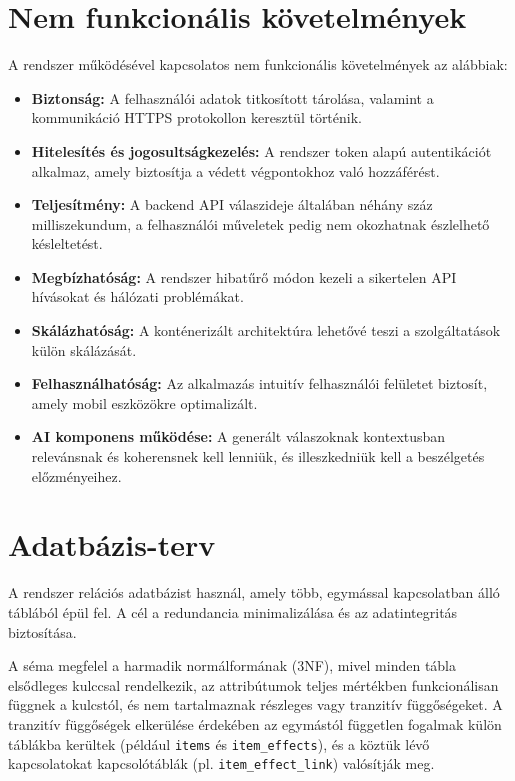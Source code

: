 \documentclass[
]{thesis-ekf}
\theoremstyle{definition}
\theoremstyle{remark}
\begin{document}
\section{Nem funkcionális követelmények}

A rendszer működésével kapcsolatos nem funkcionális követelmények az alábbiak:

\begin{itemize}
    \item \textbf{Biztonság:} A felhasználói adatok titkosított tárolása, valamint a kommunikáció HTTPS protokollon keresztül történik.
    \item \textbf{Hitelesítés és jogosultságkezelés:} A rendszer token alapú autentikációt alkalmaz, amely biztosítja a védett végpontokhoz való hozzáférést.
    \item \textbf{Teljesítmény:} A backend API válaszideje általában néhány száz milliszekundum, a felhasználói műveletek pedig nem okozhatnak észlelhető késleltetést.
    \item \textbf{Megbízhatóság:} A rendszer hibatűrő módon kezeli a sikertelen API hívásokat és hálózati problémákat.
    \item \textbf{Skálázhatóság:} A konténerizált architektúra lehetővé teszi a szolgáltatások külön skálázását.
    \item \textbf{Felhasználhatóság:} Az alkalmazás intuitív felhasználói felületet biztosít, amely mobil eszközökre optimalizált.
    \item \textbf{AI komponens működése:} A generált válaszoknak kontextusban relevánsnak és koherensnek kell lenniük, és illeszkedniük kell a beszélgetés előzményeihez.
\end{itemize}

\section{Adatbázis-terv}
\label{sec_db_plan}

A rendszer relációs adatbázist használ, amely több, egymással kapcsolatban álló táblából épül fel. A cél a redundancia minimalizálása és az adatintegritás biztosítása.

A séma megfelel a harmadik normálformának (3NF), mivel minden tábla elsődleges kulccsal rendelkezik, az attribútumok teljes mértékben funkcionálisan függnek a kulcstól, és nem tartalmaznak részleges vagy tranzitív függőségeket. A tranzitív függőségek elkerülése érdekében az egymástól független fogalmak külön táblákba kerültek (például \texttt{items} és \texttt{item\_effects}), és a köztük lévő kapcsolatokat kapcsolótáblák (pl. \texttt{item\_effect\_link}) valósítják meg.
\end{document}
